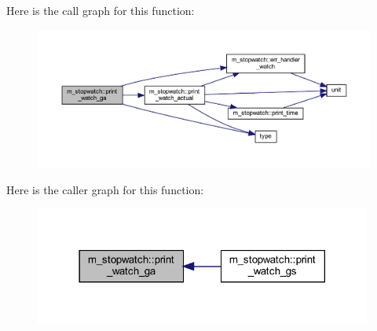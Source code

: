 Here is the call graph for this function\+:
\nopagebreak
\begin{figure}[H]
\begin{center}
\leavevmode
\includegraphics[width=350pt]{namespacem__stopwatch_a25075198a53d5b347cd1874e79f38bbb_cgraph}
\end{center}
\end{figure}
Here is the caller graph for this function\+:
\nopagebreak
\begin{figure}[H]
\begin{center}
\leavevmode
\includegraphics[width=314pt]{namespacem__stopwatch_a25075198a53d5b347cd1874e79f38bbb_icgraph}
\end{center}
\end{figure}
\mbox{\label{namespacem__stopwatch_ab397616c3f1dfa3c10e4587356de3d70}} 
